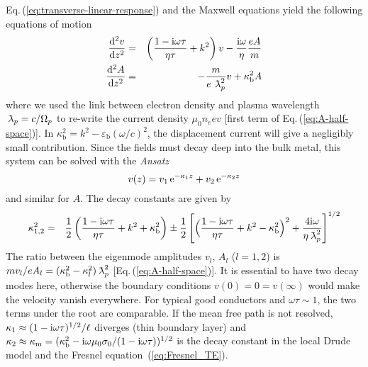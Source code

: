 \documentclass[11pt, oneside]{article}   	%
\newcommand{\lambdabar}{{\mkern+04mu\mathchar'26\mkern-09mu\lambda}}
\newcommand{\bulk}[1]{_{\mathrm{#1}}}
\begin{document}
Eq.\,(\ref{eq:transverse-linear-response}) and the Maxwell equations yield 
the following equations of motion
\begin{eqnarray}
\frac{ {\rm d}^2 v }{ {\rm d}z^2 } &=& 
\left( 
\frac{ 1 - {\rm i}\omega \tau }{ \eta \tau } + k^2 \right) v 
- \frac{ {\rm i}\omega }{ \eta }\frac{e A}{m}
\label{eq:transverse-v-half-space}
\\
\frac{ {\rm d}^2 A }{ {\rm d}z^2 } &=&
- \frac{ m }{ e \, \lambdabar_p^2} v + \kappa\bulk{b}^2 A 
\label{eq:A-half-space}
\end{eqnarray}
where we used the link between electron
density and plasma wavelength $\lambdabar_p = c/\Omega_p$ to re-write the 
current density $\mu_0 n_e e v$ [first term of Eq.\,(\ref{eq:A-half-space})].
In $\kappa\bulk{b}^2 = k^2 - \varepsilon\bulk{b}(\omega/c)^2$, the displacement current will give
a negligibly small contribution.
Since the fields must decay deep into the bulk metal, 
this system can be solved with the \emph{Ansatz} 
\begin{equation}
v(z) = v_1 \, {\rm e}^{ - \kappa_1 z } + v_2 \, {\rm e}^{ - \kappa_2 z }
\label{eq:Ansatz-velocity-profile}
\end{equation}
and similar for $A$. The decay constants are given by
\begin{eqnarray}
	\kappa_{1,2}^2 &=& 
	\frac{ 1 }{ 2 } 
	\left( \frac{ 1 - {\rm i} \omega \tau }{ \eta \tau } + k^2 + \kappa\bulk{b}^2
	\right)
	\pm
	\frac{ 1 }{ 2 } 
	\left[
	\Big( \frac{ 1 - {\rm i} \omega \tau }{ \eta \tau } + k^2 - \kappa\bulk{b}^2 \Big)^2 
	+ \frac{ 4 {\rm i} \omega }{ \eta \lambdabar_p^2 }
	\right]^{1/2}
	\label{eq:result-kappa-12}
\end{eqnarray}
The ratio between the eigenmode amplitudes $v_{l}$,
$A_{l}$ ($l = 1,2$) is $m v_{l} / e A_{l} = (\kappa\bulk{b}^2 - \kappa_{l}^2) \lambdabar_p^2$
[Eq.\,(\ref{eq:A-half-space})].
It is essential to have two decay modes here, otherwise the boundary
conditions $v( 0 ) = 0 = v( \infty )$ would make the velocity vanish everywhere. For typical
good conductors and $\omega \tau \sim 1$, the two terms
under the root are comparable. If the mean free path is not resolved, $\kappa_1 \approx
(1 - {\rm i}\omega \tau)^{1/2}/\ell$ diverges (thin boundary layer) and
$\kappa_2 \approx \kappa\bulk{m} 
= (\kappa\bulk{b}^2 - {\rm i} \omega \mu_0 \sigma_0/(1 - {\rm i}\omega\tau))^{1/2}$ 
is the decay constant in the local Drude model and the Fresnel equation~(\ref{eq:Fresnel_TE}).
\end{document}
